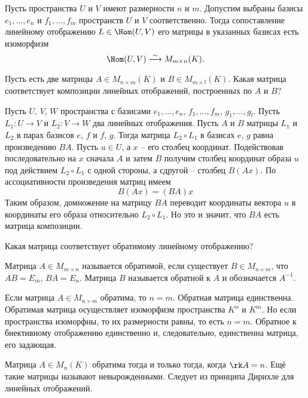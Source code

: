 \crl Пусть пространства $U$ и $V$ имеют размерности $n$ и $m$. Допустим выбраны базисы $e_1,\dots,e_n$ и $f_1,\dots,f_m$ пространств $U$ и $V$ соответственно. Тогда сопоставление линейному отображению $L \in \Hom(U,V)$ его матрицы в указанных базисах есть изоморфизм
$$\Hom(U,V) \stackrel{\sim}{\longrightarrow} M_{m\times n}(K).$$
\ecrl





Пусть есть две матрицы $A\in M_{n\times m}(K)$ и $B\in M_{m\times l}(K)$. Какая матрица соответствует композиции линейных отображений, построенных по $A$ и $B$?



\thrm Пусть $U$, $V$, $W$ пространства с базисами $e_1,\dots,e_n$, $f_1,\dots,f_m$, $g_1,\dots,g_l$. Пусть $L_1\colon U \to V$ и $L_2\colon V \to W$ два линейных отображения. Пусть $A$ и $B$ матрицы $L_1$ и $L_2$ в парах базисов $e$, $f$  и $f$, $g$. Тогда матрица $L_2 \circ L_1$ в базисах $e$, $g$ равна произведению $BA$.
\ethrm
\proof Пусть $u\in U$, а $x$ -- его столбец координат. Подействовав последовательно на $x$ сначала $A$ и затем $B$ получим столбец координат образа $u$ под действием $L_2\circ L_1$ с одной стороны, а сдругой -- столбец $B(Ax)$.  По ассоциативности произведения матриц имеем $$B(Ax)=(BA)x$$
Таким образом, домножение на матрицу $BA$ переводит координаты вектора $u$ в координаты его образа относительно $L_2 \circ L_1$. Но это и значит, что $BA$ есть матрица композиции.
\endproof




Какая матрица соответствует обратимому линейному отображению? 



\dfn Матрица $A \in M_{m\times n}$ называется обратимой, если существует $B \in M_{n\times m}$, что $AB=E_m$, $BA=E_n$.  Матрица $B$ называется обратной к $A$ и обозначается $A^{-1}$.
\edfn

\crl Если матрица $A \in M_{n\times m}$ обратима, то $n=m$. Обратная матрица единственна.
\proof Обратимая матрица осуществляет изоморфизм пространства $K^n$ и $K^m$.  Но если пространства изоморфны, то их размерности равны, то есть $n=m$. Обратное к биективному отображению единственно и, следовательно, единственна матрица, его задающая.
\endproof
\ecrl


\crl Матрица $A \in M_n(K)$  обратима тогда и только тогда, когда $\rk A=n$. Ещё такие матрицы называют невырожденными.
\ecrl
\proof Следует из принципа Дирихле для линейных отображений.
\endproof

